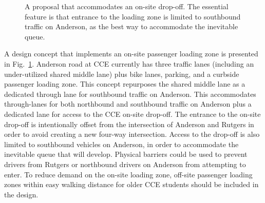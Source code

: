 \documentclass[12pt]{article}
\begin{document}
\begin{figure}[htbp]
  \caption{A proposal that accommodates an on-site drop-off. The essential
    feature is that entrance to the loading zone is limited to southbound
    traffic on Anderson, as the best way to accommodate the inevitable queue.}
  \label{fig:dropoff}
\end{figure}

\noindent
A design concept that implements an on-site passenger loading zone is
presented in Fig.~\ref{fig:dropoff}.  Anderson road at CCE currently
has three traffic lanes (including an under-utilized shared middle
lane) plus bike lanes, parking, and a curbside passenger loading zone.
This concept repurposes the shared middle lane as a dedicated through
lane for southbound traffic on Anderson.  This accommodates
through-lanes for both northbound and southbound traffic on Anderson
plus a dedicated lane for access to the CCE on-site drop-off.  The
entrance to the on-site drop-off is intentionally offset from the
intersection of Anderson and Rutgers in order to avoid creating a new
four-way intersection.  Access to the drop-off is also limited to
southbound vehicles on Anderson, in order to accommodate the
inevitable queue that will develop.  Physical barriers could be used
to prevent drivers from Rutgers or northbound drivers on Anderson from
attempting to enter.  To reduce demand on the on-site loading zone,
off-site passenger loading zones within easy walking distance for
older CCE students should be included in the design.
\end{document}
